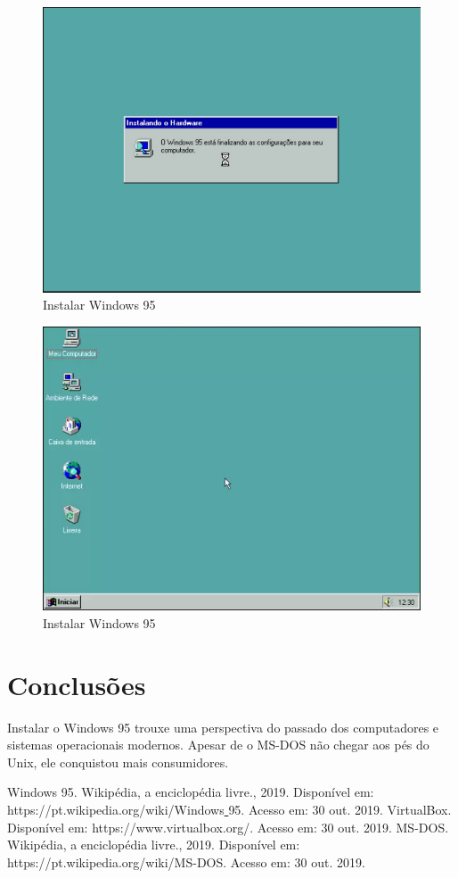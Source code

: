 \documentclass{report}
\begin{document}
\begin{figure}
\centering
\includegraphics[width=\textwidth]{Screenshot_54.png}
\caption{Instalar Windows 95}
\label{fig:54}
\end{figure}

\begin{figure}
\centering
\includegraphics[width=\textwidth]{Screenshot_55.png}
\caption{Instalar Windows 95}
\label{fig:55}
\end{figure}

\chapter{Conclusões}

Instalar o Windows 95 trouxe uma perspectiva do passado dos computadores e sistemas operacionais modernos. Apesar de o MS-DOS não chegar aos pés do Unix, ele conquistou mais consumidores.

\begin{thebibliography}{9}
Windows 95. Wikipédia, a enciclopédia livre., 2019. Disponível em: https://pt.wikipedia.org/wiki/Windows\underline{ }95. Acesso em: 30 out. 2019.
VirtualBox. Disponível em: https://www.virtualbox.org/. Acesso em: 30 out. 2019.
MS-DOS. Wikipédia, a enciclopédia livre., 2019. Disponível em: https://pt.wikipedia.org/wiki/MS-DOS. Acesso em: 30 out. 2019.
\end{thebibliography}
\end{document}
